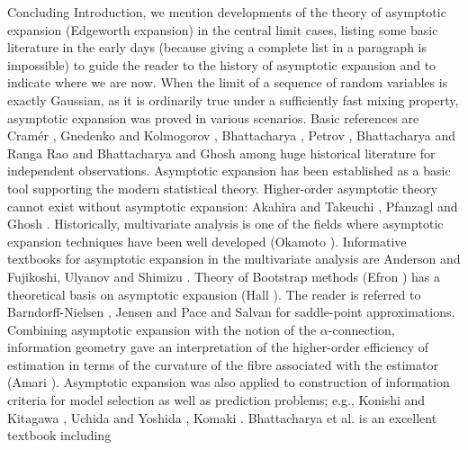 \documentclass[a4paper,12pt]{article}
\numberwithin{equation}{section}
\numberwithin{equation}{section}
\begin{document}
Concluding Introduction, we mention developments 
of the theory of asymptotic expansion (Edgeworth expansion) 
in the central limit cases, listing 
some basic literature in the early days (because giving a complete list in a paragraph is impossible) 
to guide the reader to the history of asymptotic expansion and to indicate where we are now. 
When the limit of a sequence of random variables is exactly Gaussian, 
as it is ordinarily true under a sufficiently fast mixing property, %
asymptotic expansion was proved 
in various scenarios. 
Basic references are 
Cram\'er \cite{cramer1928composition, cramer2004random}, 
Gnedenko and Kolmogorov \cite{gnedenko1954limit}, 
Bhattacharya \cite{Bhattacharya1971}, 
Petrov \cite{Petrov1975}, 
Bhattacharya and Ranga Rao \cite{BhattacharyaRanga1976} and 
Bhattacharya and Ghosh \cite{BhattacharyaGhosh1978} among huge historical literature 
for independent observations. 
Asymptotic expansion has been established as a basic tool supporting the modern statistical theory. 
%
Higher-order asymptotic theory cannot exist without asymptotic expansion: 
Akahira and Takeuchi \cite{AkahiraTakeuchi1981}, Pfanzagl \cite{Pfanzagl1985} and Ghosh \cite{Ghosh1994}.  
%
Historically, 
multivariate analysis is one of the fields where asymptotic expansion techniques have been well developed 
(Okamoto \cite{okamoto1963asymptotic}). 
Informative textbooks for asymptotic expansion in the 
multivariate analysis are 
Anderson \cite{anderson1962introduction} and 
Fujikoshi, Ulyanov and Shimizu \cite{fujikoshi2011multivariate}. 
%
Theory of Bootstrap methods (Efron \cite{efron1979bootstrap}) 
has a theoretical basis on asymptotic expansion (Hall \cite{Hall1992}). 
%
The reader is referred to 
Barndorff-Nielsen \cite{barndorff2012parametric}, 
Jensen \cite{jensen1995saddlepoint} and 
Pace and Salvan \cite{PaceSalvan1997} 
for saddle-point approximations. 
%
Combining asymptotic expansion with the notion of the $\alpha$-connection, 
information geometry 
gave an interpretation of the higher-order efficiency of estimation  
in terms of the curvature of the fibre associated with the estimator (Amari \cite{Amari1985}). 
%
Asymptotic expansion was also applied to construction of information criteria for 
model selection as well as prediction problems; 
e.g., Konishi and Kitagawa \cite{KonishiKitagawa1996}, 
Uchida and Yoshida \cite{UchidaYoshida2001,UchidaYoshida2004}, Komaki \cite{Komaki1996}. 
Bhattacharya et al. \cite{bhattacharya2016course} is an excellent textbook including 
\end{document}
